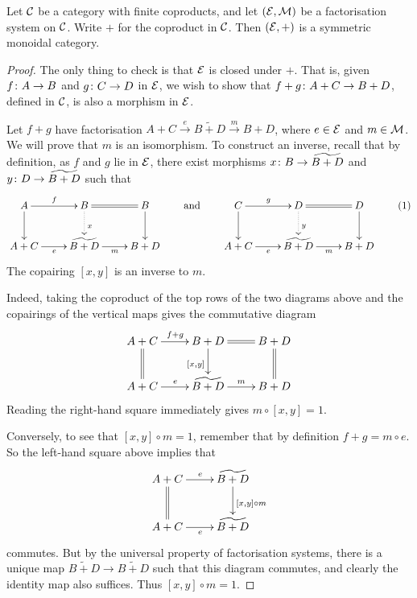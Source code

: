\begin{lemma}
  Let $\mathcal C$ be a category with finite coproducts, and let $(\mathcal E, \mathcal M)$ be a
  factorisation system on $\mathcal C$. Write $+$ for the coproduct in $\mathcal C$. Then
  $(\mathcal E,+)$ is a symmetric monoidal category.
\end{lemma}
\begin{proof}
  The only thing to check is that $\mathcal E$ is closed under $+$. That is, given
  $f{\colon} A \to B$ and $g{\colon} C \to D$ in $\mathcal E$, we wish to show that
  $f+g{\colon} A+C \to B+D$, defined in $\mathcal C$, is also a morphism in $\mathcal E$. 

  Let $f+g$ have factorisation $A+C \stackrel{e}\longrightarrow \widetilde{B+D}
  \stackrel{m}\longrightarrow B+D$, where $e \in \mathcal E$ and $m \in \mathcal
  M$. We will prove that $m$ is an isomorphism. To construct an inverse, recall
  that by definition, as $f$ and $g$ lie in $\mathcal E$, there exist morphisms
  $x{\colon} B \to \widetilde{B+D}$ and $y{\colon} D \to \widetilde{B+D}$ such that
  \[ \label{eq.coreltensor}
    \xymatrixcolsep{2pc}
    \xymatrixrowsep{2pc}
    \xymatrix{
      A \ar[r]^f \ar[d] & B \ar@{=}[r] \ar@{.>}[d]^x & B
      \ar[d] \\
      A+C \ar[r]_{e}&\widetilde{B+D} \ar[r]_{m} & B+D
    }
    \qquad \mbox{and} \qquad
    \xymatrixcolsep{2pc}
    \xymatrixrowsep{2pc}
    \xymatrix{
      C \ar[r]^g \ar[d] & D \ar@{=}[r] \ar@{.>}[d]^y & D
      \ar[d] \\
      A+C \ar[r]_{e}&\widetilde{B+D} \ar[r]_{m} & B+D
    }
    \tag{1}
  \]
  The copairing $[x,y]$ is an inverse to $m$. 
  
  Indeed, taking the coproduct of the top rows of the two diagrams above and the
  copairings of the vertical maps gives the commutative diagram
  \[
    \xymatrix{
      A+C \ar[r]^{f+g} \ar@{=}[d] & B+D \ar@{=}[r] \ar[d]_{[x,y]} & B+D \ar@{=}[d] \\
      A+C \ar[r]^{e} & \widetilde{B+D} \ar[r]^{m} & B+D
    }
  \]
  Reading the right-hand square immediately gives $m \circ [x,y] =1$.
  
  Conversely, to see that $[x,y] \circ m = 1$, remember that by definition $f+g
  = m \circ e$. So the left-hand square above implies that
  \[
    \xymatrixcolsep{2pc}
    \xymatrixrowsep{2pc}
    \xymatrix{
      A+C \ar[r]^e \ar@{=}[d] & \widetilde{B+D} \ar[d]^{[x,y] \circ m} \\
      A+C \ar[r]_{e}&\widetilde{B+D} 
    }
  \]
  commutes. But by the universal property of factorisation systems, there is a
  unique map $\widetilde{B+D} \to \widetilde{B+D}$ such that this diagram
  commutes, and clearly the identity map also suffices. Thus $[x,y] \circ m =
  1$.
\end{proof}


